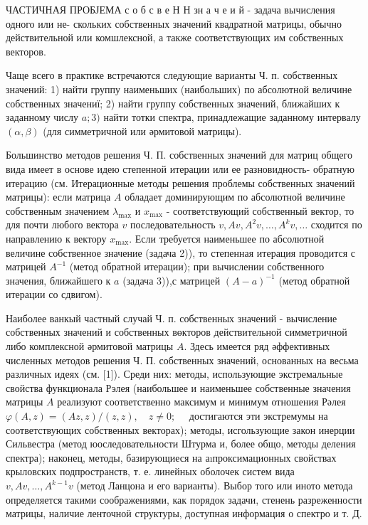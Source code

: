 \documentclass[10pt]{article}
\begin{document}
ЧАСТИЧНАЯ ПРОБЈЕМА с о б с в е Н Н зн а ч е и й - задача вычисления одного или не- скольких собственных значений квадратной матрицы, обычно действительной или комшлексной, а также соответствующих им собственных векторов.



Чаще всего в практике встречаются следующие варианты Ч. п. собственных значений: 1) найти группу наименьших (наибольших) по абсолютной величине собственных значениї; 2) найти группу собственных значений, ближайших к заданному числу $a ; 3)$ найти тотки спектра, принадлежащие заданному интервалу $(\alpha, \beta)$ (для симметричной или әрмитовой матрицы).



Большинство методов решения Ч. П. собственных значений для матриц общего вида имеет в основе идею степенной итерации или ее разновидность- обратную итерацию (см. Итерационные методы решения проблемы собственных значений матрицы): если матрица $A$ обладает доминирующим по абсолютной величине собственным значением $\lambda_{\max }$ и $x_{\max }$ - соответствующий собственный вектор, то для почти любого вектора $v$ последовательность $v, A v, A^{2} v, \ldots, A^{k} v, \ldots$ сходится по направлению к вектору $x_{\max }$. Если требуется наименьшее по абсолютной величине собственное значение (задача 2)), то степенная итерация проводится с матрицей $A^{-1}$ (метод обратной итерации); при вычислении собственного значения, ближайшего к $a$ (задача 3)),с матрицей $(A-a)^{-1}$ (метод обратной итерации со сдвигом).



Наиболее ванкый частный случай Ч. п. собственных значений - вычисление собственных значений и собственных вөкторов действительной симметричной либо комплексной әрмитовой матрицы $A$. Здесь имеется ряд әффективных численных методов решения Ч. П. собственных значений, основанных на весьма различных идеях (см. [1]). Среди них: методы, использующие экстремальные свойства функционала Рэлея (наибольшее и наименьшее собственные значения матрицы $A$ реализуют соответственно максимум и минимум отношения Рәлея $\varphi(A, z)=(A z, z) /(z, z), \quad z \neq 0 ; \quad$ достигаются эти экстремумы на соответствующих собственных векторах); методы, исгользующие закон инерции Сильвестра (метод юоследовательности Штурма и, более общо, методы деления спектра); наконец, методы, базирующиеся на аıпроксимационных свойствах крыловских подпространств, т. е. линейных оболочек систем вида $v, A v, \ldots, A^{k-1} v$ (метод Ланцона и его варианты). Выбор того или иното метода определяется такими соображениями, как порядок задачи, стенень разреженности матрицы, наличие ленточноӥ структуры, доступная информация о спектро и т. Д.
\end{document}
